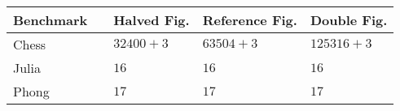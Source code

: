 
\begin{tabular}{lllll}
	Benchmark	& \hspace{3.6cm} & Halved Fig.	& Reference Fig.	& Double Fig.	\\ \hline
	Chess		& \hspace{3.6cm} & $32400+3$	& $63504+3$			& $125316+3$	\\
	Julia		& \hspace{3.6cm} & $16$			& $16$				& $16$			\\
	Phong		& \hspace{3.6cm} & $17$ 		& $17$ 				& $17$			\\
\end{tabular} %
